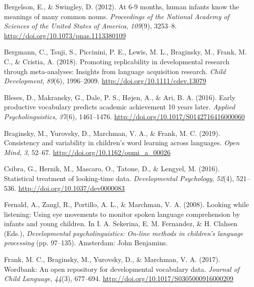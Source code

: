 \documentclass[10pt, letterpaper]{article}
\begin{document}
\setlength{\parindent}{-0.1in} 
\setlength{\leftskip}{0.125in}

\noindent

\hypertarget{refs}{}
\leavevmode\hypertarget{ref-Bergelson2012a}{}%
Bergelson, E., \& Swingley, D. (2012). At 6-9 months, human infants know
the meanings of many common nouns. \emph{Proceedings of the National
Academy of Sciences of the United States of America}, \emph{109}(9),
3253--8. \url{http://doi.org/10.1073/pnas.1113380109}

\leavevmode\hypertarget{ref-Bergmann2018}{}%
Bergmann, C., Tsuji, S., Piccinini, P. E., Lewis, M. L., Braginsky, M.,
Frank, M. C., \& Cristia, A. (2018). Promoting replicability in
developmental research through meta-analyses: Insights from language
acquisition research. \emph{Child Development}, \emph{89}(6),
1996--2009. \url{http://doi.org/10.1111/cdev.13079}

\leavevmode\hypertarget{ref-Bleses2016}{}%
Bleses, D., Makransky, G., Dale, P. S., Højen, A., \& Ari, B. A. (2016).
Early productive vocabulary predicts academic achievement 10 years
later. \emph{Applied Psycholinguistics}, \emph{37}(6), 1461--1476.
\url{http://doi.org/10.1017/S0142716416000060}

\leavevmode\hypertarget{ref-Braginsky2019}{}%
Braginsky, M., Yurovsky, D., Marchman, V. A., \& Frank, M. C. (2019).
Consistency and variability in children's word learning across
languages. \emph{Open Mind}, \emph{3}, 52--67.
\url{http://doi.org/10.1162/opmi_a_00026}

\leavevmode\hypertarget{ref-Csibra2016}{}%
Csibra, G., Hernik, M., Mascaro, O., Tatone, D., \& Lengyel, M. (2016).
Statistical treatment of looking-time data. \emph{Developmental
Psychology}, \emph{52}(4), 521--536.
\url{http://doi.org/10.1037/dev0000083}

\leavevmode\hypertarget{ref-Fernald2008}{}%
Fernald, A., Zangl, R., Portillo, A. L., \& Marchman, V. A. (2008).
Looking while listening: Using eye movements to monitor spoken language
comprehension by infants and young children. In I. A. Sekerina, E. M.
Fernandez, \& H. Clahsen (Eds.), \emph{Developmental psycholinguistics:
On-line methods in children's language processing} (pp. 97--135).
Amsterdam: John Benjamins.

\leavevmode\hypertarget{ref-Frank2016}{}%
Frank, M. C., Braginsky, M., Yurovsky, D., \& Marchman, V. A. (2017).
Wordbank: An open repository for developmental vocabulary data.
\emph{Journal of Child Language}, \emph{44}(3), 677--694.
\url{http://doi.org/10.1017/S0305000916000209}
\end{document}
